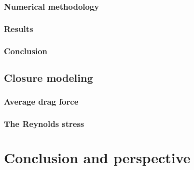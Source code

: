 \documentclass[12pt,a4paper,openany]{My_book}
\begin{document}
\section{Numerical methodology}
\label{sec:methodo}


\section{Results}

\label{sec:results}







\section{Conclusion}



\chapter{Closure modeling}
\label{chap:mono-disperse}
\localtableofcontents




\section{Average drag force}


\section{The Reynolds stress}


\part{Conclusion and perspective}





\appendix
\renewcommand{\thesection}{\Alph{section}}
\renewcommand{\thesubsection}{\Alph{section}.\arabic{subsection}}



% 
% 

% 
% 
% 
% 
% 
% 












\end{document}
